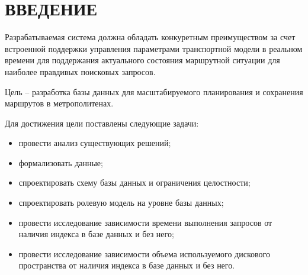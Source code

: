 \chapter*{ВВЕДЕНИЕ}

Разрабатываемая система должна обладать конкуретным преимуществом за счет встроенной поддержки управления
параметрами транспортной модели в реальном времени для поддержания актуального состояния маршрутной
ситуации для наиболее правдивых поисковых запросов.

Цель -- разработка базы данных для масштабируемого планирования и сохранения маршрутов в метрополитенах.

Для достижения цели поставлены следующие задачи:
\begin{itemize}
	\item[---] провести анализ существующих решений;
	\item[---] формализовать данные;
	\item[---] спроектировать схему базы данных и ограничения целостности;
	\item[---] спроектировать ролевую модель на уровне базы данных;
	\item[---] провести исследование зависимости времени выполнения запросов от наличия индекса в базе данных и без него;
    \item[---] провести исследование зависимости объема используемого дискового пространства от наличия индекса в базе данных и без него.
\end{itemize}